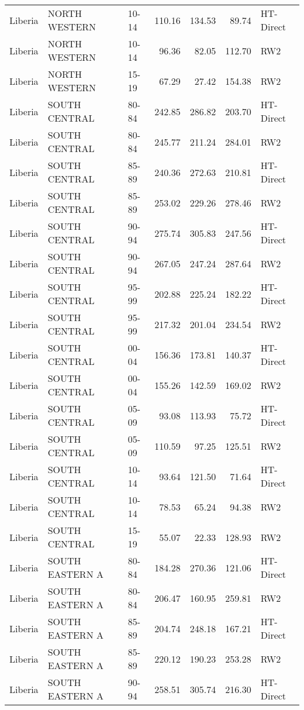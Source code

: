 \begin{longtable}{lllrrrl}
  Liberia & NORTH WESTERN & 10-14 & 110.16 & 134.53 & 89.74 & HT-Direct \\ 
  Liberia & NORTH WESTERN & 10-14 & 96.36 & 82.05 & 112.70 & RW2 \\ 
  Liberia & NORTH WESTERN & 15-19 & 67.29 & 27.42 & 154.38 & RW2 \\ 
  Liberia & SOUTH CENTRAL & 80-84 & 242.85 & 286.82 & 203.70 & HT-Direct \\ 
  Liberia & SOUTH CENTRAL & 80-84 & 245.77 & 211.24 & 284.01 & RW2 \\ 
  Liberia & SOUTH CENTRAL & 85-89 & 240.36 & 272.63 & 210.81 & HT-Direct \\ 
  Liberia & SOUTH CENTRAL & 85-89 & 253.02 & 229.26 & 278.46 & RW2 \\ 
  Liberia & SOUTH CENTRAL & 90-94 & 275.74 & 305.83 & 247.56 & HT-Direct \\ 
  Liberia & SOUTH CENTRAL & 90-94 & 267.05 & 247.24 & 287.64 & RW2 \\ 
  Liberia & SOUTH CENTRAL & 95-99 & 202.88 & 225.24 & 182.22 & HT-Direct \\ 
  Liberia & SOUTH CENTRAL & 95-99 & 217.32 & 201.04 & 234.54 & RW2 \\ 
  Liberia & SOUTH CENTRAL & 00-04 & 156.36 & 173.81 & 140.37 & HT-Direct \\ 
  Liberia & SOUTH CENTRAL & 00-04 & 155.26 & 142.59 & 169.02 & RW2 \\ 
  Liberia & SOUTH CENTRAL & 05-09 & 93.08 & 113.93 & 75.72 & HT-Direct \\ 
  Liberia & SOUTH CENTRAL & 05-09 & 110.59 & 97.25 & 125.51 & RW2 \\ 
  Liberia & SOUTH CENTRAL & 10-14 & 93.64 & 121.50 & 71.64 & HT-Direct \\ 
  Liberia & SOUTH CENTRAL & 10-14 & 78.53 & 65.24 & 94.38 & RW2 \\ 
  Liberia & SOUTH CENTRAL & 15-19 & 55.07 & 22.33 & 128.93 & RW2 \\ 
  Liberia & SOUTH EASTERN A & 80-84 & 184.28 & 270.36 & 121.06 & HT-Direct \\ 
  Liberia & SOUTH EASTERN A & 80-84 & 206.47 & 160.95 & 259.81 & RW2 \\ 
  Liberia & SOUTH EASTERN A & 85-89 & 204.74 & 248.18 & 167.21 & HT-Direct \\ 
  Liberia & SOUTH EASTERN A & 85-89 & 220.12 & 190.23 & 253.28 & RW2 \\ 
  Liberia & SOUTH EASTERN A & 90-94 & 258.51 & 305.74 & 216.30 & HT-Direct \\ 

\end{longtable}
